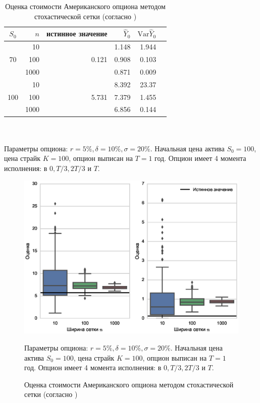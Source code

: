 \documentclass[specialist,
               substylefile = ../spbu.rtx,
               subf,href,colorlinks=true, 10pt]{disser}
\begin{document}
\begin{table}[ht]
\caption{Оценка стоимости Американского опциона методом стохастической сетки (согласно \cite{Kashtanov2015})}
\center
	\begin{tabular}{crrrrr}
	$S_0$&$n$&истинное значение&$\hat Y_0$&$\mathrm{Var} \hat Y_0$\\\hline
	&10&&1.148&1.944\\
	70&100&0.121&0.908&0.103\\
	&1000&&0.871&0.009\\\hline
	&10&&8.392&23.37\\
	100&100&5.731&7.379&1.455\\
	&1000&&6.856&0.144\\\hline
	\end{tabular}
	\\\hfill
	\\\hfill
	\footnotesize{Параметры опциона: $r = 5\%, \delta = 10\%, \sigma = 20\%$. Начальная цена актива $S_0 = 100$, цена страйк $K = 100$, опцион выписан на $T=1$ год. Опцион имеет 4 момента исполнения: в $0, T/3, 2T/3$ и $T$.}
	\label{tbl:mesh}
\end{table}
\begin{figure}
\center\includegraphics[width=\textwidth]{mesh_plot.eps}
	\caption{Оценка стоимости Американского опциона методом стохастической сетки (согласно \cite{Kashtanov2015})}
	\footnotesize{Параметры опциона: $r = 5\%, \delta = 10\%, \sigma = 20\%$. Начальная цена актива $S_0 = 100$, цена страйк $K = 100$, опцион выписан на $T=1$ год. Опцион имеет 4 момента исполнения: в $0, T/3, 2T/3$ и $T$.}
	\label{fig:mesh}
\end{figure}
\end{document}
